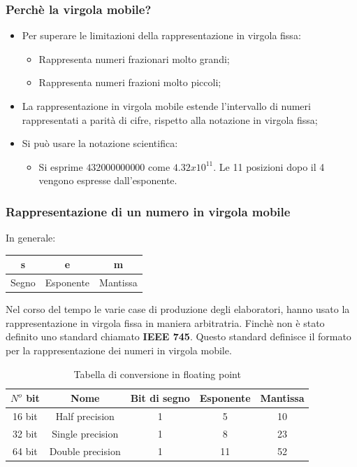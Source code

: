\subsubsection*{Perchè la virgola mobile?}
\begin{itemize}
    \item Per superare le limitazioni della rappresentazione in virgola fissa:
    \begin{itemize}
        \item Rappresenta numeri frazionari molto grandi;
        \item Rappresenta numeri frazioni molto piccoli;
    \end{itemize}
    \item La rappresentazione in virgola mobile estende l’intervallo di numeri rappresentati a parità di cifre, rispetto alla notazione in virgola fissa;
    \item Si può usare la notazione scientifica:
    \begin{itemize}
        \item Si esprime $432 000 000 000$ come $4.32 x 10^{11}$. Le 11 posizioni dopo il 4 vengono espresse dall’esponente.
    \end{itemize}
\end{itemize}

\subsubsection{Rappresentazione di un numero in virgola mobile}\label{sec:virgola_mobile}

In generale:
\begin{center}
\begin{tabular}{c|c|c}
     \textbf{s} & \textbf{e} & \textbf{m}\\\hline
     Segno & Esponente & Mantissa
\end{tabular}
\end{center}

Nel corso del tempo le varie case di produzione degli elaboratori, hanno usato la rappresentazione in virgola fissa in maniera arbitratria.
Finchè non è stato definito uno standard chiamato \textbf{IEEE 745}. Questo standard definisce il formato per la rappresentazione dei numeri in virgola mobile.

\begin{table}[h]
    \centering
    \begin{tabular}{c|cccc}
        $N^o$ bit & Nome & Bit di segno & Esponente & Mantissa\\\hline
        16 bit & Half precision & 1 & 5 & 10\\\hline
        32 bit & Single precision & 1 & 8 & 23\\\hline
        64 bit & Double precision & 1 & 11 & 52
    \end{tabular}
    \caption{Tabella di conversione in floating point}
    \label{tab:ieee754}
\end{table}


